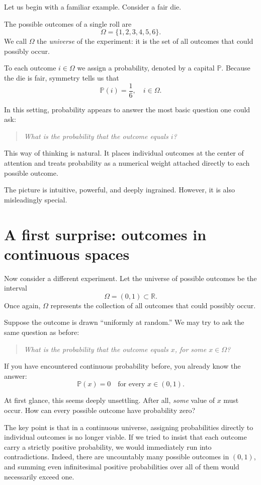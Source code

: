 \documentclass[11pt]{article}
\theoremstyle{remark}
\begin{document}
Let us begin with a familiar example.  
Consider a fair die.

The possible outcomes of a single roll are
\[
\Omega = \{1,2,3,4,5,6\}.
\]
We call \(\Omega\) the \emph{universe} of the experiment: it is the set of all outcomes
that could possibly occur.

To each outcome \(i \in \Omega\) we assign a probability, denoted by a capital
\(\mathbb{P}\).
Because the die is fair, symmetry tells us that
\[
\mathbb{P}(i) = \frac{1}{6}, \quad i \in \Omega.
\]

In this setting, probability appears to answer the most basic question one could ask:
\begin{quote}
\emph{What is the probability that the outcome equals \(i\)?}
\end{quote}

This way of thinking is natural.  
It places individual outcomes at the center of attention and treats probability as
a numerical weight attached directly to each possible outcome.

The picture is intuitive, powerful, and deeply ingrained.  
However, it is also misleadingly special.


\section{A first surprise: outcomes in continuous spaces}

Now consider a different experiment.  
Let the universe of possible outcomes be the interval
\[
\Omega = (0,1) \subset \mathbb{R}.
\]
Once again, \(\Omega\) represents the collection of all outcomes that could possibly
occur.

Suppose the outcome is drawn “uniformly at random.”
We may try to ask the same question as before:
\begin{quote}
\emph{What is the probability that the outcome equals \(x\), for some \(x \in \Omega\)?}
\end{quote}

If you have encountered continuous probability before, you already know the answer:
\[
\mathbb{P}(x) = 0 \quad \text{for every } x \in (0,1).
\]

At first glance, this seems deeply unsettling.  
After all, \emph{some} value of \(x\) must occur.  
How can every possible outcome have probability zero?

The key point is that in a continuous universe, assigning probabilities directly
to individual outcomes is no longer viable.
If we tried to insist that each outcome carry a strictly positive probability,
we would immediately run into contradictions.
Indeed, there are uncountably many possible outcomes in \((0,1)\), and summing
even infinitesimal positive probabilities over all of them would necessarily
exceed one.
\end{document}
